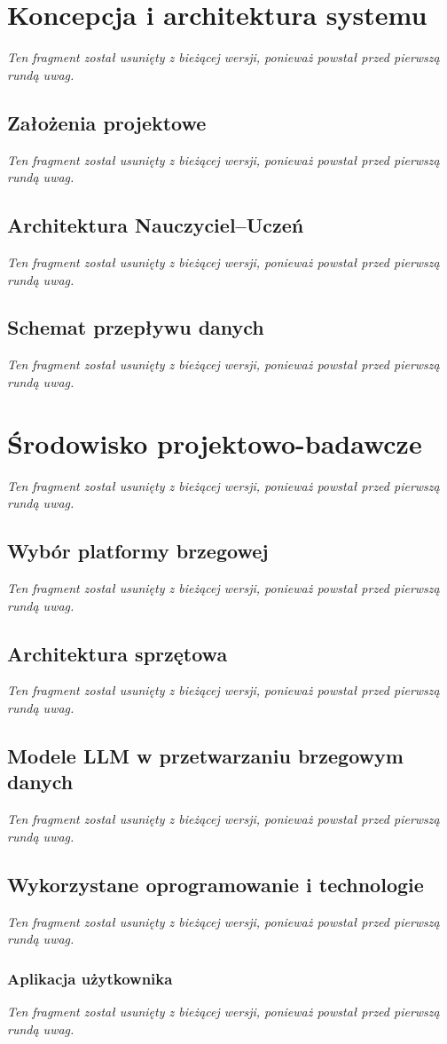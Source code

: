\documentclass[
    a4paper,
    left=25mm,
    right=25mm,
    top=25mm,
    bottom=25mm,
    bindingoffset=5mm,
    nohyphenation=false
]{src/wut-thesis}
\newcommand{\nieredagowane}{%
\textit{Ten fragment został usunięty z bieżącej wersji, ponieważ powstał przed pierwszą rundą uwag.}%
}
\begin{document}
\newpage
\section{Koncepcja i architektura systemu}
\label{sec:koncepcja}
\nieredagowane

\subsection{Założenia projektowe}
\nieredagowane

\subsection{Architektura Nauczyciel–Uczeń}
\label{subsec:teacher_student}
\nieredagowane

\subsection{Schemat przepływu danych}
\label{subsec:przeplyw}
\nieredagowane

\newpage
\section{Środowisko projektowo-badawcze}
\nieredagowane

\subsection{Wybór platformy brzegowej}
\nieredagowane

\subsection{Architektura sprzętowa}
\nieredagowane

\subsection{Modele LLM w przetwarzaniu brzegowym danych}
\nieredagowane

\subsection{Wykorzystane oprogramowanie i technologie}
\nieredagowane

\subsubsection{Aplikacja użytkownika}
\nieredagowane
\end{document}
